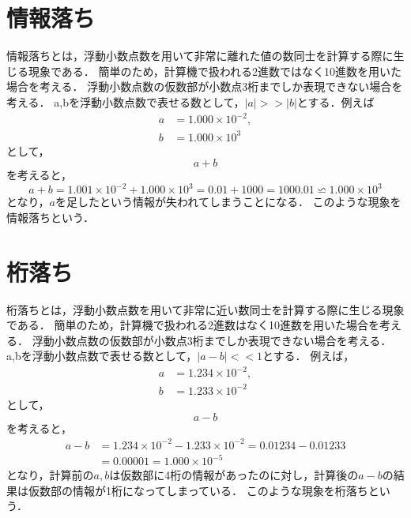 \section{情報落ち}
情報落ちとは，浮動小数点数を用いて非常に離れた値の数同士を計算する際に生じる現象である．
簡単のため，計算機で扱われる2進数ではなく10進数を用いた場合を考える．
浮動小数点数の仮数部が小数点3桁までしか表現できない場合を考える．
a,bを浮動小数点数で表せる数として，$|a| >> |b|$とする．例えば
\begin{align*}
    a &= 1.000 \times 10^{-2}, \\
    b &= 1.000 \times 10^{3}
\end{align*}
として，
\begin{equation*}
    a + b
\end{equation*}
を考えると，
\begin{equation*}
    a + b = 1.001 \times 10^{-2} + 1.000 \times 10^{3} = 0.01 + 1000 = 1000.01 \backsimeq 1.000 \times 10^{3}
\end{equation*}
となり，$a$を足したという情報が失われてしまうことになる．
このような現象を情報落ちという．

\section{桁落ち}
桁落ちとは，浮動小数点数を用いて非常に近い数同士を計算する際に生じる現象である．
簡単のため，計算機で扱われる2進数はなく10進数を用いた場合を考える．
浮動小数点数の仮数部が小数点3桁までしか表現できない場合を考える．
a,bを浮動小数点数で表せる数として，$|a - b| << 1$とする．
例えば，
\begin{align*}
    a &= 1.234 \times 10^{-2}, \\
    b &= 1.233 \times 10^{-2}
\end{align*}
として，
\begin{equation*}
    a - b
\end{equation*}
を考えると，
\begin{align*}
    a - b &= 1.234 \times 10^{-2} - 1.233 \times 10^{-2} = 0.01234 - 0.01233 \\
    &= 0.00001 = 1.000 \times 10^{-5}
\end{align*}
となり，計算前の$a,b$は仮数部に4桁の情報があったのに対し，計算後の$a-b$の結果は仮数部の情報が1桁になってしまっている．
このような現象を桁落ちという．